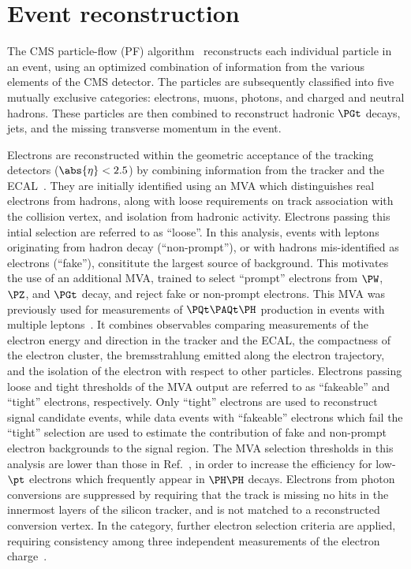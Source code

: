 \section{Event reconstruction}
\label{sec:eventReconstruction}

The CMS particle-flow (PF) algorithm~\cite{Sirunyan:2017ulk} reconstructs each individual particle in an event,
using an optimized combination of information from the various elements of the CMS detector.
The particles are subsequently classified into five mutually exclusive categories: 
electrons, muons, photons, and charged and neutral hadrons.
These particles are then combined to reconstruct hadronic $\PGt$ decays, jets, and the missing transverse momentum in the event.

Electrons are reconstructed within the geometric acceptance of the tracking detectors ($\abs{\eta} < 2.5$)
by combining information from the tracker and the ECAL~\cite{Khachatryan:2015hwa}.
They are initially identified using an MVA which distinguishes real electrons from hadrons, %
along with loose requirements on track association with the collision vertex, and isolation from hadronic activity.
Electrons passing this intial selection are referred to as ``loose''.
In this analysis, events with leptons originating from hadron decay (``non-prompt''), or with
hadrons mis-identified as electrons (``fake''), consititute the largest source of background.
This motivates the use of an additional MVA, trained to select ``prompt'' electrons
from $\PW$, $\PZ$, and $\PGt$ decay, and reject fake or non-prompt electrons.
This MVA was previously used for measurements of $\ttH$ production in events with multiple leptons~\cite{Sirunyan:2020icl}.
It combines observables comparing measurements of the electron energy and direction in the tracker and the ECAL,
the compactness of the electron cluster, the bremsstrahlung emitted along the electron trajectory,
and the isolation of the electron with respect to other particles.
Electrons passing loose and tight thresholds of the MVA output are referred to as ``fakeable'' and ``tight'' electrons, respectively.
Only ``tight'' electrons are used to reconstruct signal candidate events, while data events with ``fakeable'' electrons which fail
the ``tight'' selection are used to estimate the contribution of fake and non-prompt electron backgrounds to the signal region.
The MVA selection thresholds in this analysis are lower than those in Ref.~\cite{Sirunyan:2020icl}, in order to increase
the efficiency for low-$\pt$ electrons which frequently appear in $\HH$ decays.
Electrons from photon conversions are suppressed by requiring that the track is missing no hits
in the innermost layers of the silicon tracker, and is not matched to a reconstructed conversion vertex.
In the \twoLeptonssZeroTau category, further electron selection criteria are applied,
requiring consistency among three independent measurements of the electron charge~\cite{Khachatryan:2015hwa}.


